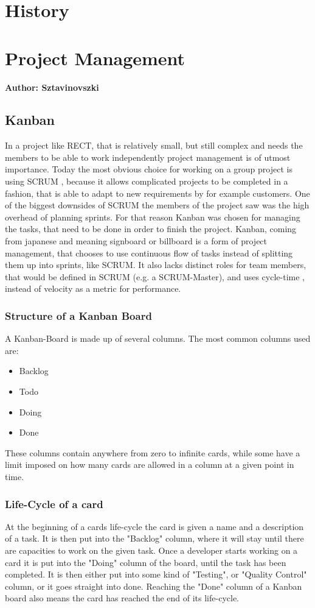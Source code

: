 \section{History}

\section{Project Management}
\textbf{Author: Sztavinovszki}

\subsection{Kanban}
In a project like RECT, that is relatively small, but still complex and needs the members to be able to work independently project management is of utmost importance. Today the most
obvious choice for working on a group project is using SCRUM \cite{what-is-scrum}, because it allows complicated projects to be completed in a fashion, 
that is able to adapt to new requirements by for example customers. One of the biggest downsides of SCRUM the members of the project saw was the high overhead of planning sprints. 
For that reason Kanban was chosen for managing the tasks, that need to be done in order to finish the project. Kanban, coming from japanese and meaning signboard or billboard 
\cite{what-is-kanban} is a form of project management, that chooses to use continuous flow of tasks instead of splitting them up into sprints, like SCRUM. 
It also lacks distinct roles for team members, that would be defined in SCRUM (e.g. a SCRUM-Master), and uses cycle-time \cite{cycle-time-lead-time},
instead of velocity as a metric for performance. 

\subsubsection{Structure of a Kanban Board}
A Kanban-Board is made up of several columns. The most common columns used are:
\begin{itemize}
\item Backlog
\item Todo
\item Doing
\item Done
\end{itemize}
These columns contain anywhere from zero to infinite cards, while some have a limit imposed on how many cards are allowed in a column at a given point in time.

\subsubsection{Life-Cycle of a card}
At the beginning of a cards life-cycle the card is given a name and a description of a task. It is then put into the "Backlog" column, where it will stay until there are capacities
to work on the given task. Once a developer starts working on a card it is put into the "Doing" column of the board, until the task has been completed. It is then either put into
some kind of "Testing", or "Quality Control" column, or it goes straight into done. Reaching the "Done" column of a Kanban board also means the card has reached the end of its
life-cycle.


